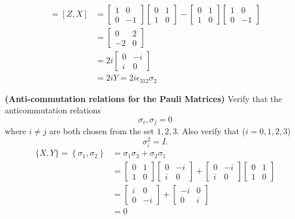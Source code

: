 \begin{align*}
	[\sigma_3,\sigma_1] = \left[Z, X\right] &= \begin{bmatrix}
	1 & 0 \\
	0 & -1
	\end{bmatrix}
	\begin{bmatrix}
	0 & 1 \\
	1 & 0
	\end{bmatrix}
	-
	\begin{bmatrix}
	0 & 1 \\
	1 & 0
	\end{bmatrix}
	\begin{bmatrix}
	1 & 0 \\
	0 & -1
	\end{bmatrix}\\
	&=\begin{bmatrix}
	0 & 2 \\
	-2 & 0
	\end{bmatrix}\\
	&=
	2i \begin{bmatrix}
	0 & -i \\
	i & 0
	\end{bmatrix}\\
	&= 2iY = 2i\epsilon_{312}\sigma_2
\end{align*}

 \textbf{(Anti-commutation relations for the Pauli Matrices)}  Verify that the anticommutation relations $${\sigma_i,\sigma_j}=0$$ where $i\neq j$ are both chosen from the set $1,2,3$.  Also verify that  ($i=0,1,2,3$) $$\sigma_i^2 = I.$$
\Soln
\begin{align*}
\{X, Y\} = \left\{\sigma_1, \sigma_2 \right\} &=\sigma_1 \sigma_2 + \sigma_2 \sigma_1\\
&= \begin{bmatrix}
0 & 1 \\
1 & 0
\end{bmatrix}
\begin{bmatrix}
0 & -i \\
i & 0
\end{bmatrix}
+
\begin{bmatrix}
0 & -i \\
i & 0
\end{bmatrix}
\begin{bmatrix}
0 & 1 \\
1 & 0
\end{bmatrix} \\
%
&=
%
\begin{bmatrix}
i & 0 \\
0 & -i
\end{bmatrix}
+
\begin{bmatrix}
-i & 0 \\
0 & i
\end{bmatrix}\\
%
&= 0
\end{align*}

